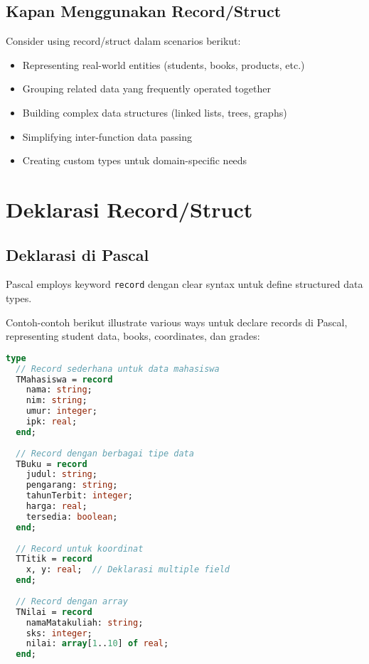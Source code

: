 \documentclass[../main.tex]{subfiles}
\begin{document}
\subsection{Kapan Menggunakan Record/Struct}

Consider using record/struct dalam scenarios berikut:
\begin{itemize}
  \item Representing real-world entities (students, books, products, etc.)
  \item Grouping related data yang frequently operated together
  \item Building complex data structures (linked lists, trees, graphs)
  \item Simplifying inter-function data passing
  \item Creating custom types untuk domain-specific needs
\end{itemize}

\section{Deklarasi Record/Struct}

\subsection{Deklarasi di Pascal}

Pascal employs keyword \texttt{record} dengan clear syntax untuk define structured data types.

Contoh-contoh berikut illustrate various ways untuk declare records di Pascal, representing student data, books, coordinates, dan grades:

\begin{lstlisting}[language=Pascal, caption={Deklarasi record di Pascal}]
type
  // Record sederhana untuk data mahasiswa
  TMahasiswa = record
    nama: string;
    nim: string;
    umur: integer;
    ipk: real;
  end;
  
  // Record dengan berbagai tipe data
  TBuku = record
    judul: string;
    pengarang: string;
    tahunTerbit: integer;
    harga: real;
    tersedia: boolean;
  end;
  
  // Record untuk koordinat
  TTitik = record
    x, y: real;  // Deklarasi multiple field
  end;
  
  // Record dengan array
  TNilai = record
    namaMatakuliah: string;
    sks: integer;
    nilai: array[1..10] of real;
  end;
\end{lstlisting}
\end{document}
